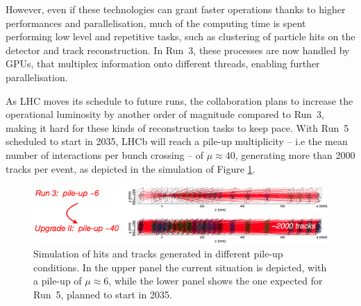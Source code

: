 


However, even if these technologies can grant faster operations thanks to higher performances and parallelisation, much of the computing time is spent performing low level and repetitive tasks, such as clustering of particle hits on the detector and track reconstruction. In Run~3, these processes are now handled by GPUs, that multiplex  information onto different threads, enabling further parallelisation.

As LHC moves its schedule to future runs, the collaboration plans to increase the operational luminosity by another order of magnitude compared to Run~3, making it hard for these kinds of reconstruction tasks to keep pace. With Run~5 scheduled to start in 2035, LHCb will reach a pile-up multiplicity -- i.e the mean number of interactions per bunch crossing -- of $\mu\approx 40$, generating more than 2000 tracks per event, as depicted in the simulation of Figure \ref{fig:velo_pile-up}. 

\begin{figure}
    \centering
    \includegraphics[width=\textwidth]{figures/VELO_pile-up.png}
    \caption{Simulation of hits and tracks generated in different pile-up conditions. In the upper panel the current situation is depicted, with a pile-up of $\mu\approx 6$, while the lower panel shows the one expected for Run~5, planned to start in 2035.}
    \label{fig:velo_pile-up}
\end{figure}

